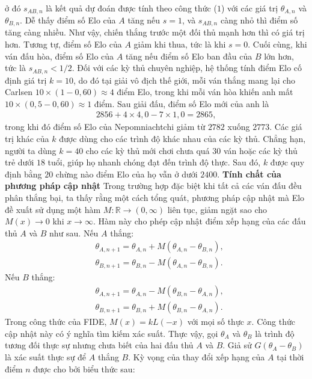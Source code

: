 \begin{multicols}{2}
\begin{align*}
	\end{align*}
	ở đó $s_{AB, n}$ là kết quả dự đoán được tính theo công thức ($1$) với các giá trị $\theta_{A, n}$ và $\theta_{B, n}$. Dễ thấy điểm số Elo của $A$ tăng nếu $s = 1$, và $s_{AB, n}$ càng nhỏ thì điểm số tăng càng nhiều. Như vậy, chiến thắng trước một đối thủ mạnh hơn thì có giá trị hơn. Tương tự, điểm số Elo của $A$ giảm khi thua, tức là khi $s = 0$. Cuối cùng, khi ván đấu hòa, điểm số Elo của $A$ tăng nếu điểm số Elo ban đầu của $B$ lớn hơn, tức là $s_{AB, n} < 1/2$.
	Đối với các kỳ thủ chuyên nghiệp, hệ thống tính điểm Elo cố định giá trị $k = 10$, do đó tại giải vô địch thế giới, mỗi ván thắng mang lại cho Carlsen $10 \times (1 - 0{,}60) \approx 4$ điểm Elo, trong khi mỗi ván hòa khiến anh mất $10 \times (0{,}5 - 0{,}60) \approx 1$ điểm. Sau giải đấu, điểm số Elo mới của anh là
	\begin{align*}
		2856 + 4 \times 4{,}0 - 7 \times 1{,}0 = 2865,
	\end{align*}
	trong khi đó điểm số Elo của Nepomniachtchi giảm từ $2782$ xuống $2773$.
	\vskip 0.05cm
	Các giá trị khác của $k$ được dùng cho các trình độ khác nhau của các kỳ thủ. Chẳng hạn, người ta dùng $k = 40$ cho các kỳ thủ mới chơi chưa quá $30$ ván hoặc các kỳ thủ trẻ dưới $18$ tuổi, giúp họ nhanh chóng đạt đến trình độ thực. Sau đó, $k$ được quy định bằng $20$ chừng nào điểm Elo của họ vẫn ở dưới $2400$.
	\vskip 0.05cm
	\textbf{\color{toanhocdoisong}Tính chất của phương pháp cập nhật}
	\vskip 0.05cm
	Trong trường hợp đặc biệt khi tất cả các ván đấu đều phân thắng bại, ta thấy rằng một cách tổng quát, phương pháp cập nhật mà Elo đề xuất sử dụng một hàm $M: \mathbb R \rightarrow (0, \infty)$ liên tục, giảm ngặt sao cho $M(x) \rightarrow 0$ khi $x \rightarrow \infty$. Hàm này cho phép cập nhật điểm xếp hạng của các đấu thủ $A$ và $B$ như sau.
	\vskip 0.05cm
	Nếu $A$ thắng:
	\begin{align*}
		&\theta_{A, n  +1} = \theta_{A, n} + M(\theta_{A, n} - \theta_{B, n}),\\
		&\theta_{B, n  +1} = \theta_{B, n} - M(\theta_{A, n} - \theta_{B, n}).
	\end{align*}
	Nếu $B$ thắng:
	\begin{align*}
		&\theta_{A, n  +1} = \theta_{A, n} - M(\theta_{B, n} - \theta_{A, n}),\\
		&\theta_{B, n  +1} = \theta_{B, n} + M(\theta_{B, n} - \theta_{A, n}).
	\end{align*}
	Trong công thức của FIDE, $M(x) = k L(-x)$ với mọi số thực $x$.
	\vskip 0.01cm
	Công thức cập nhật này có ý nghĩa tìm kiếm xác suất. Thực vậy, gọi $\theta_A$ và $\theta_B$ là trình độ tương đối thực sự nhưng chưa biết của hai đấu thủ $A$ và $B$. Giả sử $G(\theta_A - \theta_B)$ là xác suất thực sự để $A$ thắng $B$. Kỳ vọng của thay đổi xếp hạng của $A$ tại thời điểm $n$ được cho bởi biểu thức sau:

\end{multicols}
